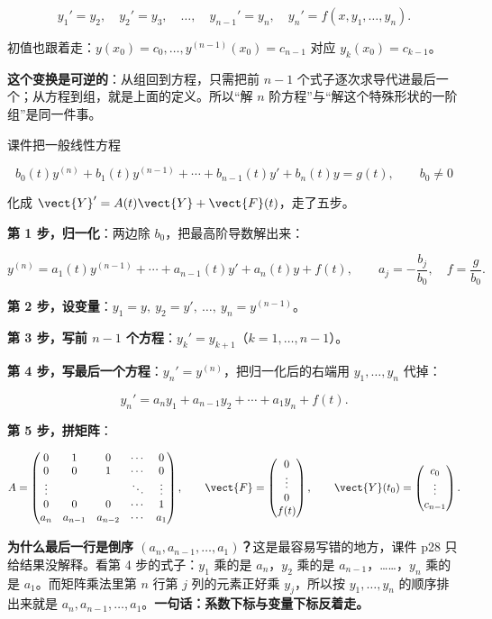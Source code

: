 \documentclass[11pt]{ctexart}
\newcommand{\mat}[1]{\begin{pmatrix}#1\end{pmatrix}}
\begin{document}
\[
y_1'=y_2,\quad y_2'=y_3,\quad\dots,\quad y_{n-1}'=y_n,\quad y_n'=f(x,y_1,\dots,y_n).
\]

初值也跟着走：$y(x_0)=c_0,\dots,y^{(n-1)}(x_0)=c_{n-1}$ 对应 $y_k(x_0)=c_{k-1}$。

\textbf{这个变换是可逆的}：从组回到方程，只需把前 $n-1$ 个式子逐次求导代进最后一个；从方程到组，就是上面的定义。所以“解 $n$ 阶方程”与“解这个特殊形状的一阶组”是同一件事。


课件把一般线性方程

\[
b_0(t)y^{(n)}+b_1(t)y^{(n-1)}+\cdots+b_{n-1}(t)y'+b_n(t)y=g(t),\qquad b_0\neq0
\]

化成 $\vect{Y}'=A(t)\vect{Y}+\vect{F}(t)$，走了五步。

\textbf{第 1 步，归一化}：两边除 $b_0$，把最高阶导数解出来：

\[
y^{(n)}=a_1(t)y^{(n-1)}+\cdots+a_{n-1}(t)y'+a_n(t)y+f(t),
\qquad a_j=-\frac{b_j}{b_0},\quad f=\frac{g}{b_0}.
\]

\textbf{第 2 步，设变量}：$y_1=y,\ y_2=y',\ \dots,\ y_n=y^{(n-1)}$。

\textbf{第 3 步，写前 $n-1$ 个方程}：$y_k'=y_{k+1}$（$k=1,\dots,n-1$）。

\textbf{第 4 步，写最后一个方程}：$y_n'=y^{(n)}$，把归一化后的右端用 $y_1,\dots,y_n$ 代掉：

\[
y_n'=a_n y_1+a_{n-1}y_2+\cdots+a_1y_n+f(t).
\]

\textbf{第 5 步，拼矩阵}：

\[
A=\begin{pmatrix}
0&1&0&\cdots&0\\
0&0&1&\cdots&0\\
\vdots& & &\ddots&\vdots\\
0&0&0&\cdots&1\\
a_n&a_{n-1}&a_{n-2}&\cdots&a_1
\end{pmatrix},
\qquad
\vect{F}=\mat{0\\ \vdots\\ 0\\ f(t)},\qquad
\vect{Y}(t_0)=\mat{c_0\\ \vdots\\ c_{n-1}}.
\]

\textbf{为什么最后一行是倒序 $(a_n,a_{n-1},\dots,a_1)$？}这是最容易写错的地方，课件 p28 只给结果没解释。看第 4 步的式子：$y_1$ 乘的是 $a_n$，$y_2$ 乘的是 $a_{n-1}$，……，$y_n$ 乘的是 $a_1$。而矩阵乘法里第 $n$ 行第 $j$ 列的元素正好乘 $y_j$，所以按 $y_1,\dots,y_n$ 的顺序排出来就是 $a_n,a_{n-1},\dots,a_1$。\textbf{一句话：系数下标与变量下标反着走。}
\end{document}
